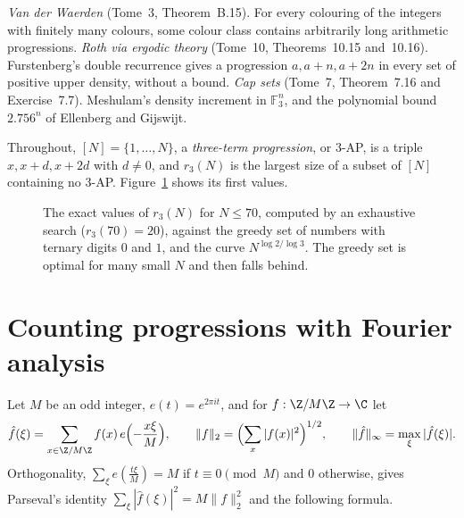 \begin{reminder}
\emph{Van der Waerden} (Tome~3, Theorem~B.15). For every colouring of the integers with finitely many colours, some colour class contains arbitrarily long arithmetic progressions.
\emph{Roth via ergodic theory} (Tome~10, Theorems~10.15 and~10.16). Furstenberg's double recurrence gives a progression $a,a+n,a+2n$ in every set of positive upper density, without a bound.
\emph{Cap sets} (Tome~7, Theorem~7.16 and Exercise~7.7). Meshulam's density increment in $\mathbb F_3^n$, and the polynomial bound $2.756^n$ of Ellenberg and Gijswijt.
\end{reminder}

Throughout, $[N]=\{1,\dots,N\}$, a \emph{three-term progression}, or $3$-AP, is a triple $x,x+d,x+2d$ with $d\neq0$, and $r_3(N)$ is the largest size of a subset of $[N]$ containing no $3$-AP. Figure~\ref{fig:r3} shows its first values.

\begin{figure}[ht]
\centering
{}
\caption{The exact values of $r_3(N)$ for $N\le70$, computed by an exhaustive search ($r_3(70)=20$), against the greedy set of numbers with ternary digits $0$ and $1$, and the curve $N^{\log2/\log3}$. The greedy set is optimal for many small $N$ and then falls behind.}
\label{fig:r3}
\end{figure}

\section{Counting progressions with Fourier analysis}

Let $M$ be an odd integer, $e(t)=e^{2\pi it}$, and for $f:\Z/M\Z\to\C$ let
\[
\hat f(\xi)=\sum_{x\in\Z/M\Z}f(x)\,e\Bigl(-\frac{x\xi}M\Bigr),\qquad\|f\|_2=\Bigl(\sum_x|f(x)|^2\Bigr)^{1/2},\qquad\|\hat f\|_\infty=\max_\xi|\hat f(\xi)|.
\]
Orthogonality, $\sum_{\xi}e(\frac{t\xi}M)=M$ if $t\equiv0\pmod M$ and $0$ otherwise, gives Parseval's identity $\sum_\xi|\hat f(\xi)|^2=M\|f\|_2^2$ and the following formula.


